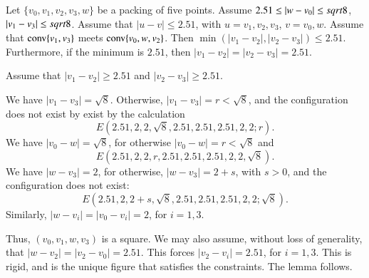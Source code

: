 \begin{tarskidata}
\begin{tarski}
%

\begin{lemma} 
Let $\{v_0,v_1,v_2,v_3,w\}$  be a packing of five points.
Assume $2.51\le|w-v_0|\le sqrt8$, $|v_1-v_3|\le sqrt8$.
Assume that $|u-v|\le 2.51$, with $u=v_1,v_2,v_3$,
$v=v_0,w$.
Assume that ${\operatorname{conv}}\{v_1,v_3\}$ meets ${\operatorname{conv}}\{v_0,w,v_2\}$.
Then
$\min(|v_1-v_2|,|v_2-v_3|)\le2.51$. Furthermore, if the minimum is
$2.51$, then $|v_1-v_2|=|v_2-v_3|=2.51$.
\end{lemma}


\begin{proved}
Assume that $|v_1-v_2|\ge 2.51$ and $|v_2-v_3|\ge2.51$.

We have $|v_1-v_3|=\sqrt8$.  Otherwise,
$|v_1-v_3|=r<\sqrt8$, and the configuration does not exist by
exist by the calculation
  $$
  E(2.51,2,2,\sqrt8,2.51,2.51,2.51,2,2; r).
  $$
We have $|v_0-w|=\sqrt8$, for otherwise $|v_0-w|=r<\sqrt8$ and
$$
   E(2.51,2,2,r,2.51,2.51,2.51,2,2,\sqrt8).
$$
We have $|w-v_3|=2$, for otherwise,
$|w-v_3|=2+s$, with $s>0$, and  
the configuration does not exist:
  $$
  E(2.51,2,2+s,\sqrt8,2.51,2.51,2.51,2,2;\sqrt8). 
  $$
Similarly, $|w-v_i|=|v_0-v_i|=2$, for $i=1,3$.

Thus, $(v_0,v_1,w,v_3)$ is a square.
 We may also assume, without loss of generality, that
$|w-v_2|=|v_2-v_0|=2.51$. This forces $|v_2-v_i|=2.51$, for $i=1,3$.
This is rigid,  and is the unique figure that satisfies the
constraints. The lemma follows.
\swallowed\end{proved}
\end{tarski}









\begin{tarski}


\end{tarski}
\end{tarskidata}
